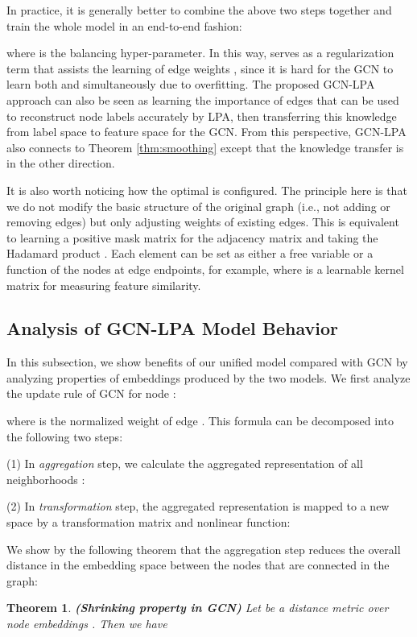 \documentclass{article}
\newtheorem{theorem}{Theorem}
\begin{document}
		In practice, it is generally better to combine the above two steps together and train the whole model in an end-to-end fashion:
		
		where  is the balancing hyper-parameter.
		In this way,  serves as a regularization term that assists the learning of edge weights , since it is hard for the GCN to learn both  and  simultaneously due to overfitting.
		The proposed GCN-LPA approach can also be seen as learning the importance of edges that can be used to reconstruct node labels accurately by LPA, then transferring this knowledge from label space to feature space for the GCN.
		From this perspective, GCN-LPA also connects to Theorem \ref{thm:smoothing} except that the knowledge transfer is in the other direction.
		
		It is also worth noticing how the optimal  is configured.
		The principle here is that we do not modify the basic structure of the original graph (i.e., not adding or removing edges) but only adjusting weights of existing edges.
		This is equivalent to learning a positive mask matrix  for the adjacency matrix  and taking the Hadamard product .
		Each element  can be set as either a free variable or a function of the nodes at edge endpoints, for example,  where  is a learnable kernel matrix for measuring feature similarity.
		
	
	\subsection{Analysis of GCN-LPA Model Behavior}
	\label{sec:discussion}
		In this subsection, we show benefits of our unified model compared with GCN by analyzing properties of embeddings produced by the two models.
    	We first analyze the update rule of GCN for node :
    	
    	where  is the normalized weight of edge .
		This formula can be decomposed into the following two steps:
		
		(1) In \textit{aggregation} step, we calculate the aggregated representation  of all neighborhoods :
		
		(2) In \textit{transformation} step, the aggregated representation  is mapped to a new space by a transformation matrix and nonlinear function:
		
		
		We show by the following theorem that the aggregation step reduces the overall distance in the embedding space between the nodes that are connected in the graph:
		\begin{theorem}
		\label{thm:decrease}
			\rm\textbf{(Shrinking property in GCN)}
			Let  be a distance metric over node embeddings .
Then we have
			
		\end{theorem}
		
\end{document}
